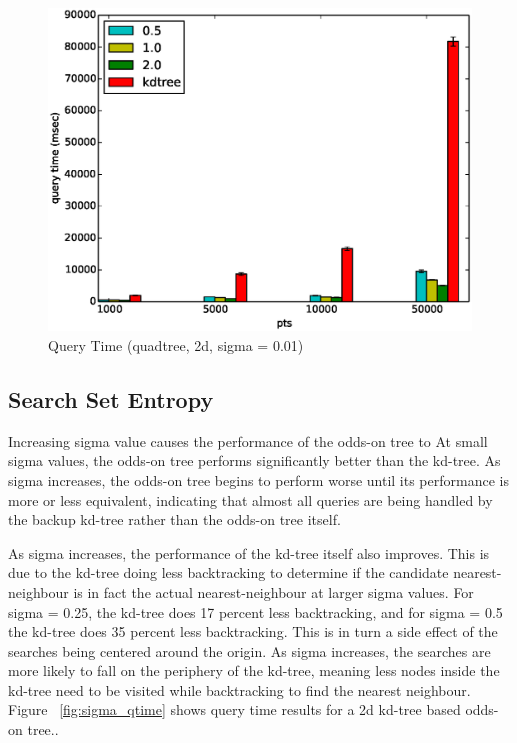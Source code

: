 \documentclass[mcs]{scsthesis}
\begin{document}
\begin{figure}
\begin{center}
\includegraphics[scale=0.5]{diagrams/2d_group_bypts_sigma0.01_qtime_qt.eps}
\caption{Query Time (quadtree, 2d, sigma = 0.01)}
\label{fig:point_set_size_qtime_qt}
\end{center}
\end{figure}

\subsection{Search Set Entropy}

Increasing sigma value causes the performance of the odds-on tree to
At small sigma values, the odds-on tree performs significantly better than
the kd-tree. As sigma increases, the odds-on tree begins to perform worse
until its performance is more or less equivalent, indicating that almost
all queries are being handled by the backup kd-tree rather than the odds-on
tree itself.

As sigma increases, the performance of the kd-tree itself also improves.
This is due to the kd-tree doing less backtracking to determine if the
candidate nearest-neighbour is in fact the actual nearest-neighbour at
larger sigma values. For sigma = 0.25, the kd-tree does 17 percent less
backtracking, and for sigma = 0.5 the kd-tree does 35 percent less
backtracking. This is in turn a side effect of the searches being centered
around the origin. As sigma increases, the searches are more likely to
fall on the periphery of the kd-tree, meaning less nodes inside the
kd-tree need to be visited while backtracking to find the nearest
neighbour. Figure ~\ref{fig:sigma_qtime} shows query time results for a 2d
kd-tree based odds-on tree..
\end{document}

